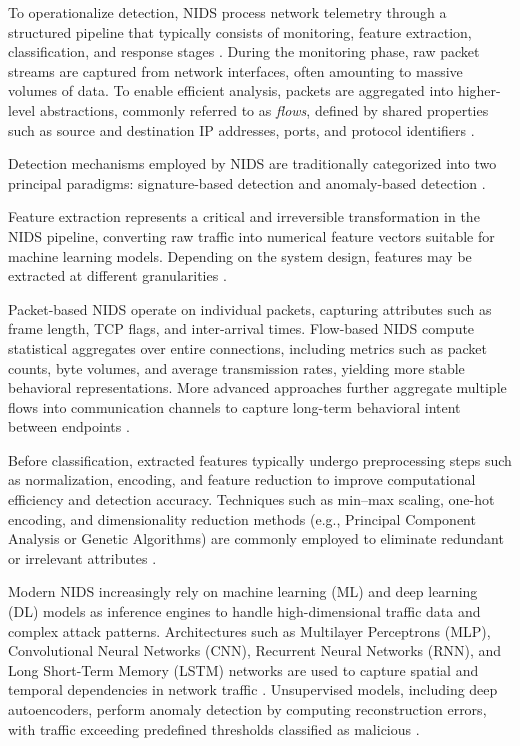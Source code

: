 To operationalize detection, NIDS process network telemetry through a structured pipeline that typically consists of monitoring, feature extraction, classification, and response stages \cite{vitorino2023sok}. During the monitoring phase, raw packet streams are captured from network interfaces, often amounting to massive volumes of data. To enable efficient analysis, packets are aggregated into higher-level abstractions, commonly referred to as \emph{flows}, defined by shared properties such as source and destination IP addresses, ports, and protocol identifiers \cite{he2023adversarial, hartl2020explainability}.

Detection mechanisms employed by NIDS are traditionally categorized into two principal paradigms: signature-based detection and anomaly-based detection \cite{alotaibi2023adversarial}.

Feature extraction represents a critical and irreversible transformation in the NIDS pipeline, converting raw traffic into numerical feature vectors suitable for machine learning models. Depending on the system design, features may be extracted at different granularities \cite{han2021evaluating, hartl2020explainability}. 

Packet-based NIDS operate on individual packets, capturing attributes such as frame length, TCP flags, and inter-arrival times. Flow-based NIDS compute statistical aggregates over entire connections, including metrics such as packet counts, byte volumes, and average transmission rates, yielding more stable behavioral representations. More advanced approaches further aggregate multiple flows into communication channels to capture long-term behavioral intent between endpoints \cite{hashemi2020enhancing, vitorino2023sok, cui2023cbseq}.

Before classification, extracted features typically undergo preprocessing steps such as normalization, encoding, and feature reduction to improve computational efficiency and detection accuracy. Techniques such as min--max scaling, one-hot encoding, and dimensionality reduction methods (e.g., Principal Component Analysis or Genetic Algorithms) are commonly employed to eliminate redundant or irrelevant attributes \cite{doriguzzi2020lucid, alasad2026comprehensive}.

Modern NIDS increasingly rely on machine learning (ML) and deep learning (DL) models as inference engines to handle high-dimensional traffic data and complex attack patterns. Architectures such as Multilayer Perceptrons (MLP), Convolutional Neural Networks (CNN), Recurrent Neural Networks (RNN), and Long Short-Term Memory (LSTM) networks are used to capture spatial and temporal dependencies in network traffic \cite{he2023adversarial, zhang2022adversarial}. Unsupervised models, including deep autoencoders, perform anomaly detection by computing reconstruction errors, with traffic exceeding predefined thresholds classified as malicious \cite{sarikaya2023raids}.

